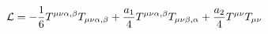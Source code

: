 \begin{equation}
{\cal L} = - \frac{1}{6} T^{\mu\nu\alpha,\beta} T_{\mu\nu\alpha,\beta}
+ \frac{a_1}{4} T^{\mu\nu\alpha,\beta} T_{\mu\nu\beta,\alpha} +
\frac{a_2}{4} T^{\mu\nu} T_{\mu\nu}
\end{equation}

